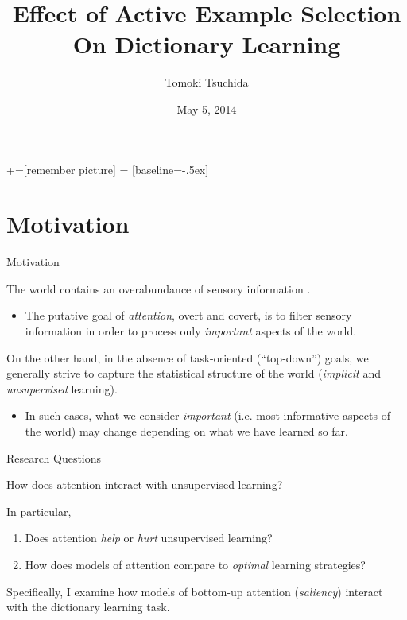 \documentclass{beamer}
\title{Effect of Active Example Selection \\ On Dictionary Learning}
\author{Tomoki Tsuchida}
\institute{University of California, San Diego\\
Computer Science and Engineering}
\date{May 5, 2014}
\begin{document}
+=[remember picture]
 = [baseline=-.5ex]


\let\oldfootnotesize\footnotesize
\renewcommand*{\footnotesize}{\oldfootnotesize\tiny}

\begin{frame}
\titlepage
\end{frame}

\section{Motivation}

\begin{frame}{Motivation}

The world contains an overabundance of sensory information \cite{Tsotsos:1990vv}.

\begin{itemize}
	\item The putative goal of \emph{attention}, overt and covert, is to filter sensory information in order to process only \emph{important} aspects of the world.

\end{itemize}

On the other hand, in the absence of task-oriented (``top-down'') goals, we generally strive to capture the statistical structure of the world (\emph{implicit} and \emph{unsupervised} learning).

\begin{itemize}
	\item In such cases, what we consider \emph{important} (i.e. most informative aspects of the world) may change depending on what we have learned so far.
\end{itemize}
\end{frame}

\begin{frame}{Research Questions}
\begin{center}
\begin{beamerboxesrounded}[lower=lowyellow,upper=upyellow,shadow=true]{}
How does attention interact with unsupervised learning? 
\end{beamerboxesrounded}
\end{center}
In particular,

\begin{enumerate}
	\item Does attention \emph{help} or \emph{hurt} unsupervised learning?
	\item How does models of attention compare to \emph{optimal} learning strategies?
\end{enumerate}

Specifically, I examine how models of bottom-up attention (\emph{saliency}) interact with the dictionary learning task.

\end{frame}
\end{document}
